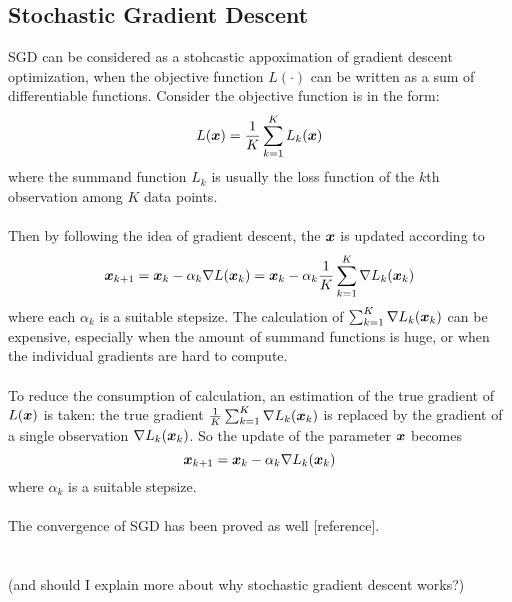 \documentclass[11pt]{article}
\begin{document}
    \subsection{Stochastic Gradient Descent}
        SGD can be considered as a stohcastic appoximation of gradient descent optimization, 
        when the objective function $L(\cdot)$ can be written as a sum of differentiable functions.
        Consider the objective function is in the form:
        $$
        L(\bm{x}) =\frac{1}{K} \sum_{k=1}^{K} L_k (\bm{x})
        $$
        where the summand function $L_k$ is usually the loss function of the $k$th observation among
        $K$ data points.
        \\\\
        Then by following the idea of gradient descent, the $\bm{x}$ is updated according to
        $$
        \bm{x}_{k+1} = \bm{x}_{k} -\alpha_k \nabla L(\bm{x}_k) = \bm{x}_{k} -\alpha_k \frac{1}{K}\sum_{k=1}^{K} \nabla L_k(\bm{x}_k)
        $$
        where each $\alpha_k$ is a suitable stepsize. The calculation of $\sum_{k=1}^{K} \nabla L_k(\bm{x}_k)$ can be
        expensive, especially when the amount of summand functions is huge, or when the individual gradients are hard to
        compute. 
        \\\\
        To reduce the consumption of calculation, an estimation of the true gradient of $L(\bm{x})$ is taken: 
        the true gradient $\frac{1}{K} \sum_{k=1}^{K} \nabla L_k(\bm{x}_k)$ is replaced by the gradient of a single observation $\nabla L_k(\bm{x}_k)$. 
        So the update of the parameter $\bm{x}$ becomes
        $$
        \bm{x}_{k+1} = \bm{x}_{k} - \alpha_k \nabla L_k(\bm{x}_k)        
        $$
        where $\alpha_k$ is a suitable stepsize. 
        \\\\
        The convergence of SGD has been proved as well{\color{red} [reference]}. 
        \\\\\\
        (and should I explain more about why stochastic gradient descent works?)



\newpage
\cite{ben-haimStreamingParallelDecision}


\end{document}
